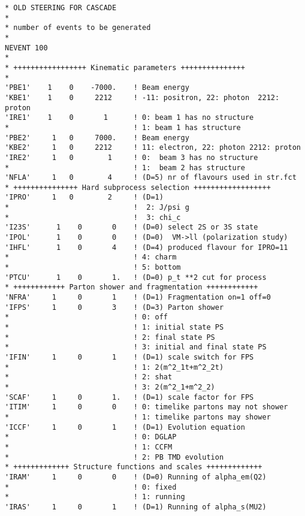 \documentclass[11pt]{article} \usepackage{mystyle-new}
\begin{document}
\begin{footnotesize}
\begin{verbatim}
* OLD STEERING FOR CASCADE 
*
* number of events to be generated
*
NEVENT 100
*
* +++++++++++++++++ Kinematic parameters +++++++++++++++
*
'PBE1'    1    0    -7000.    ! Beam energy                                 
'KBE1'    1    0     2212     ! -11: positron, 22: photon  2212: proton 
'IRE1'    1    0       1      ! 0: beam 1 has no structure 
*                             ! 1: beam 1 has structure  
'PBE2'     1   0     7000.    ! Beam energy  
'KBE2'     1   0     2212     ! 11: electron, 22: photon 2212: proton
'IRE2'     1   0        1     ! 0:  beam 3 has no structure 
*                             ! 1:  beam 2 has structure 
'NFLA'     1   0        4     ! (D=5) nr of flavours used in str.fct
* +++++++++++++++ Hard subprocess selection ++++++++++++++++++
'IPRO'     1   0        2     ! (D=1) 
*                             !  2: J/psi g
*                             !  3: chi_c
'I23S'      1    0       0    ! (D=0) select 2S or 3S state
'IPOL'      1    0       0    ! (D=0)  VM->ll (polarization study)
'IHFL'      1    0       4    ! (D=4) produced flavour for IPRO=11
*                             ! 4: charm
*                             ! 5: bottom				        
'PTCU'      1    0       1.   ! (D=0) p_t **2 cut for process
* ++++++++++++ Parton shower and fragmentation ++++++++++++
'NFRA'     1     0       1    ! (D=1) Fragmentation on=1 off=0
'IFPS'     1     0       3    ! (D=3) Parton shower
*                             ! 0: off
*                             ! 1: initial state PS
*                             ! 2: final state PS
*                             ! 3: initial and final state PS
'IFIN'     1     0       1    ! (D=1) scale switch for FPS
*                             ! 1: 2(m^2_1t+m^2_2t)    
*                             ! 2: shat     
*                             ! 3: 2(m^2_1+m^2_2)     
'SCAF'     1     0       1.   ! (D=1) scale factor for FPS
'ITIM'     1     0       0    ! 0: timelike partons may not shower
*                             ! 1: timelike partons may shower
'ICCF'     1     0       1    ! (D=1) Evolution equation 
*                             ! 0: DGLAP
*                             ! 1: CCFM
*                             ! 2: PB TMD evolution
* +++++++++++++ Structure functions and scales +++++++++++++
'IRAM'     1     0       0    ! (D=0) Running of alpha_em(Q2)
*                             ! 0: fixed
*                             ! 1: running
'IRAS'     1     0       1    ! (D=1) Running of alpha_s(MU2)

\end{verbatim}
\end{footnotesize}
\end{document}
